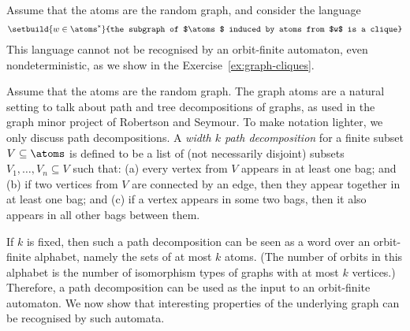    \begin{myexample}
	\label{ex:graph-atoms-connected} Assume that the atoms are the random graph, and consider the language 
	\begin{align*}
	\setbuild{ w \in \atoms^*}{the subgraph of $\atoms$ induced by atoms from $w$ is a clique}
	\end{align*}
	This language cannot not be recognised by an orbit-finite automaton, even nondeterministic, as we show in the Exercise~\ref{ex:graph-cliques}.
   \end{myexample}
   
   
   \begin{myexample}
	Assume that the atoms are the random graph.  The graph atoms are a natural setting to talk about path and tree decompositions of graphs, as used in the graph minor project of Robertson and Seymour. To make notation lighter, we only discuss path decompositions. 
	 A \emph{width $k$ path decomposition} for a finite subset $V \subseteq \atoms$ is defined to be a list of (not necessarily disjoint) subsets $V_1,\ldots,V_n \subseteq V$ such that: (a) every vertex from $V$ appears in at least one bag; and (b) if two vertices from $V$ are connected by an edge, then they appear together in  at least one bag; and (c) if a vertex appears in some two bags, then it also appears in all other bags between them.

	 If $k$ is fixed, then  such a path decomposition can be seen as a word over an orbit-finite alphabet, namely the sets of at most $k$ atoms. (The number of orbits in this alphabet is the number of isomorphism types of graphs with at most $k$ vertices.)  Therefore, a path decomposition  can be used as the input to an orbit-finite automaton. 
	 We now show that interesting properties of the underlying graph can be recognised by such automata. 
	

\end{myexample}
